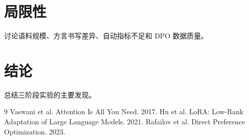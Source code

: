 \documentclass[UTF8,twocolumn]{ctexart}
\begin{document}
\section{局限性}
讨论语料规模、方言书写差异、自动指标不足和 DPO 数据质量。

\section{结论}
总结三阶段实验的主要发现。


\begin{thebibliography}{9}
 Vaswani et al. Attention Is All You Need. 2017.
 Hu et al. LoRA: Low-Rank Adaptation of Large Language Models. 2021.
 Rafailov et al. Direct Preference Optimization. 2023.
\end{thebibliography}
\end{document}
